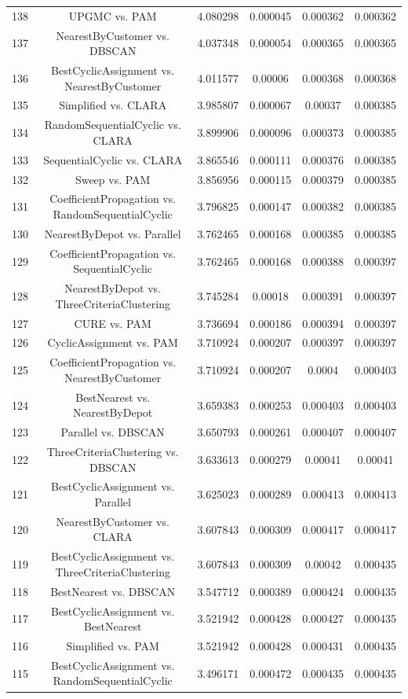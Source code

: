\documentclass[a4paper,10pt]{article}
\begin{document}
\begin{landscape}
\begin{table}[!htp]
\begin{tabular}{cccccc}
138&UPGMC vs. PAM&4.080298&0.000045&0.000362&0.000362\\
137&NearestByCustomer vs. DBSCAN&4.037348&0.000054&0.000365&0.000365\\
136&BestCyclicAssignment vs. NearestByCustomer&4.011577&0.00006&0.000368&0.000368\\
135&Simplified vs. CLARA&3.985807&0.000067&0.00037&0.000385\\
134&RandomSequentialCyclic vs. CLARA&3.899906&0.000096&0.000373&0.000385\\
133&SequentialCyclic vs. CLARA&3.865546&0.000111&0.000376&0.000385\\
132&Sweep vs. PAM&3.856956&0.000115&0.000379&0.000385\\
131&CoefficientPropagation vs. RandomSequentialCyclic&3.796825&0.000147&0.000382&0.000385\\
130&NearestByDepot vs. Parallel&3.762465&0.000168&0.000385&0.000385\\
129&CoefficientPropagation vs. SequentialCyclic&3.762465&0.000168&0.000388&0.000397\\
128&NearestByDepot vs. ThreeCriteriaClustering&3.745284&0.00018&0.000391&0.000397\\
127&CURE vs. PAM&3.736694&0.000186&0.000394&0.000397\\
126&CyclicAssignment vs. PAM&3.710924&0.000207&0.000397&0.000397\\
125&CoefficientPropagation vs. NearestByCustomer&3.710924&0.000207&0.0004&0.000403\\
124&BestNearest vs. NearestByDepot&3.659383&0.000253&0.000403&0.000403\\
123&Parallel vs. DBSCAN&3.650793&0.000261&0.000407&0.000407\\
122&ThreeCriteriaClustering vs. DBSCAN&3.633613&0.000279&0.00041&0.00041\\
121&BestCyclicAssignment vs. Parallel&3.625023&0.000289&0.000413&0.000413\\
120&NearestByCustomer vs. CLARA&3.607843&0.000309&0.000417&0.000417\\
119&BestCyclicAssignment vs. ThreeCriteriaClustering&3.607843&0.000309&0.00042&0.000435\\
118&BestNearest vs. DBSCAN&3.547712&0.000389&0.000424&0.000435\\
117&BestCyclicAssignment vs. BestNearest&3.521942&0.000428&0.000427&0.000435\\
116&Simplified vs. PAM&3.521942&0.000428&0.000431&0.000435\\
115&BestCyclicAssignment vs. RandomSequentialCyclic&3.496171&0.000472&0.000435&0.000435\\

\end{tabular}
\end{table}
\end{landscape}
\end{document}

